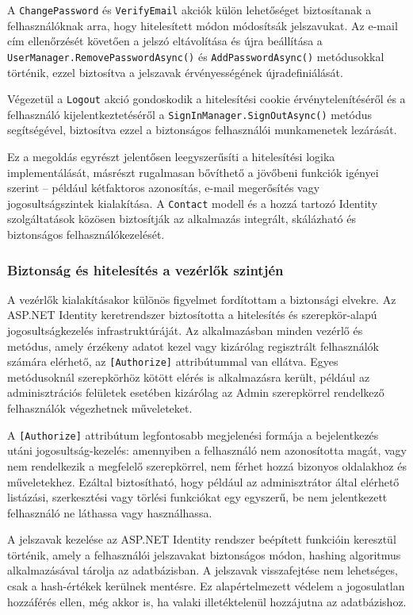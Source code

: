 A \texttt{ChangePassword} és \texttt{VerifyEmail} akciók külön lehetőséget biztosítanak a felhasználóknak arra, hogy hitelesített módon módosítsák jelszavukat. Az e-mail cím ellenőrzését követően a jelszó eltávolítása és újra beállítása a \texttt{UserManager.RemovePasswordAsync()} és \texttt{AddPasswordAsync()} metódusokkal történik, ezzel biztosítva a jelszavak érvényességének újradefiniálását.

Végezetül a \texttt{Logout} akció gondoskodik a hitelesítési cookie érvénytelenítéséről és a felhasználó kijelentkeztetéséről a \texttt{SignInManager.SignOutAsync()} metódus segítségével, biztosítva ezzel a biztonságos felhasználói munkamenetek lezárását.

Ez a megoldás egyrészt jelentősen leegyszerűsíti a hitelesítési logika implementálását, másrészt rugalmasan bővíthető a jövőbeni funkciók igényei szerint – például kétfaktoros azonosítás, e-mail megerősítés vagy jogosultságszintek kialakítása. A \texttt{Contact} modell és a hozzá tartozó Identity szolgáltatások közösen biztosítják az alkalmazás integrált, skálázható és biztonságos felhasználókezelését.


\subsubsection{Biztonság és hitelesítés a vezérlők szintjén}
A vezérlők kialakításakor különös figyelmet fordítottam a biztonsági elvekre. Az ASP.NET Identity keretrendszer biztosította a hitelesítés és szerepkör-alapú jogosultságkezelés infrastruktúráját. Az alkalmazásban minden vezérlő és metódus, amely érzékeny adatot kezel vagy kizárólag regisztrált felhasználók számára elérhető, az \texttt{[Authorize]} attribútummal van ellátva. Egyes metódusoknál szerepkörhöz kötött elérés is alkalmazásra került, például az adminisztrációs felületek esetében kizárólag az Admin szerepkörrel rendelkező felhasználók végezhetnek műveleteket.

A \texttt{[Authorize]} attribútum legfontosabb megjelenési formája a bejelentkezés utáni jogosultság-kezelés: amennyiben a felhasználó nem azonosította magát, vagy nem rendelkezik a megfelelő szerepkörrel, nem férhet hozzá bizonyos oldalakhoz és műveletekhez. Ezáltal biztosítható, hogy például az adminisztrátor által elérhető listázási, szerkesztési vagy törlési funkciókat egy egyszerű, be nem jelentkezett felhasználó ne láthassa vagy használhassa.

A jelszavak kezelése az ASP.NET Identity rendszer beépített funkcióin keresztül történik, amely a felhasználói jelszavakat biztonságos módon, hashing algoritmus alkalmazásával tárolja az adatbázisban. A jelszavak visszafejtése nem lehetséges, csak a hash-értékek kerülnek mentésre. Ez alapértelmezett védelem a jogosulatlan hozzáférés ellen, még akkor is, ha valaki illetéktelenül hozzájutna az adatbázishoz.

